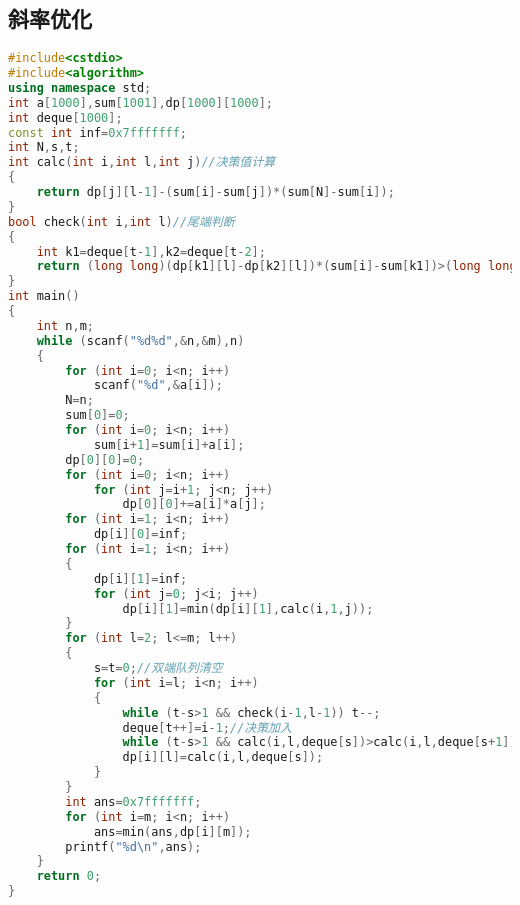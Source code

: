 \subsection{斜率优化}
    \begin{lstlisting}[language=c++]
#include<cstdio>
#include<algorithm>
using namespace std;
int a[1000],sum[1001],dp[1000][1000];
int deque[1000];
const int inf=0x7fffffff;
int N,s,t;
int calc(int i,int l,int j)//决策值计算
{
    return dp[j][l-1]-(sum[i]-sum[j])*(sum[N]-sum[i]);
}
bool check(int i,int l)//尾端判断
{
    int k1=deque[t-1],k2=deque[t-2];
    return (long long)(dp[k1][l]-dp[k2][l])*(sum[i]-sum[k1])>(long long)(dp[i][l]-dp[k1][l])*(sum[k1]-sum[k2]);
}
int main()
{
    int n,m;
    while (scanf("%d%d",&n,&m),n)
    {
        for (int i=0; i<n; i++)
            scanf("%d",&a[i]);
        N=n;
        sum[0]=0;
        for (int i=0; i<n; i++)
            sum[i+1]=sum[i]+a[i];
        dp[0][0]=0;
        for (int i=0; i<n; i++)
            for (int j=i+1; j<n; j++)
                dp[0][0]+=a[i]*a[j];
        for (int i=1; i<n; i++)
            dp[i][0]=inf;
        for (int i=1; i<n; i++)
        {
            dp[i][1]=inf;
            for (int j=0; j<i; j++)
                dp[i][1]=min(dp[i][1],calc(i,1,j));
        }
        for (int l=2; l<=m; l++)
        {
            s=t=0;//双端队列清空
            for (int i=l; i<n; i++)
            {
                while (t-s>1 && check(i-1,l-1)) t--;
                deque[t++]=i-1;//决策加入
                while (t-s>1 && calc(i,l,deque[s])>calc(i,l,deque[s+1])) s++;
                dp[i][l]=calc(i,l,deque[s]);
            }
        }
        int ans=0x7fffffff;
        for (int i=m; i<n; i++)
            ans=min(ans,dp[i][m]);
        printf("%d\n",ans);
    }
    return 0;
}
    \end{lstlisting}
